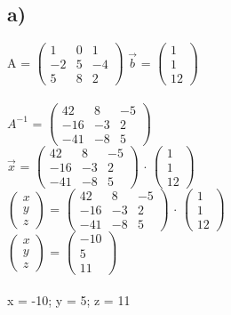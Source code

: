 \documentclass{article}
\begin{document}
	\subsection*{a)}
	A = 
	$\left(\begin{array}{ccc}
	 1 & 0 & 1 \\ -2 & 5 & -4 \\ 5 & 8 & 2
	\end{array}\right)$
	$\vec{b}$ =
	$\left(\begin{array}{c}
	1 \\ 1 \\ 12
	\end{array}\right)$ \\ \\
	$A^{-1}$ =
	$\left(\begin{matrix}
		42 & 8 & -5 \\
		-16 & -3 & 2 \\
		-41 & -8 & 5
	\end{matrix}\right)
    $ \\
    $\vec{x}$ = 
    $\left(\begin{matrix}
    42 & 8 & -5 \\
    -16 & -3 & 2 \\
    -41 & -8 & 5
    \end{matrix}\right) $
    $\cdot$
    $\left(\begin{array}{c}
    1 \\ 1 \\ 12
    \end{array}\right)$ \\
    $\left(\begin{array}{c}
    x \\ y \\ z
    \end{array}\right)$ =
     $\left(\begin{matrix}
    42 & 8 & -5 \\
    -16 & -3 & 2 \\
    -41 & -8 & 5
    \end{matrix}\right) $
    $\cdot$
    $\left(\begin{array}{c}
    1 \\ 1 \\ 12
    \end{array}\right)$ \\
     $\left(\begin{array}{c}
    x \\ y \\ z
    \end{array}\right)$
    = 
   $ \left(\begin{matrix}
    	-10 \\
    	5 \\
    	11
    \end{matrix}\right)$ \\ \\
    x = -10; y = 5; z = 11
\end{document}
